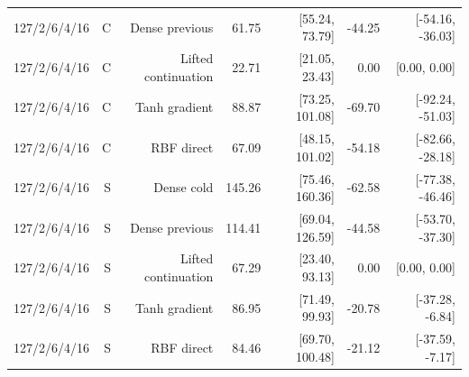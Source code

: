 \begin{table}[tbp]
\begin{tabular}{lrrrrrr}
127/2/6/4/16 & C & Dense previous & 61.75 & [55.24, 73.79] & -44.25 & [-54.16, -36.03]\\
127/2/6/4/16 & C & Lifted continuation & 22.71 & [21.05, 23.43] & 0.00 & [0.00, 0.00]\\
127/2/6/4/16 & C & Tanh gradient & 88.87 & [73.25, 101.08] & -69.70 & [-92.24, -51.03]\\
127/2/6/4/16 & C & RBF direct & 67.09 & [48.15, 101.02] & -54.18 & [-82.66, -28.18]\\
127/2/6/4/16 & S & Dense cold & 145.26 & [75.46, 160.36] & -62.58 & [-77.38, -46.46]\\
127/2/6/4/16 & S & Dense previous & 114.41 & [69.04, 126.59] & -44.58 & [-53.70, -37.30]\\
127/2/6/4/16 & S & Lifted continuation & 67.29 & [23.40, 93.13] & 0.00 & [0.00, 0.00]\\
127/2/6/4/16 & S & Tanh gradient & 86.95 & [71.49, 99.93] & -20.78 & [-37.28, -6.84]\\
127/2/6/4/16 & S & RBF direct & 84.46 & [69.70, 100.48] & -21.12 & [-37.59, -7.17]\\
\bottomrule
\end{tabular}
\end{table}


